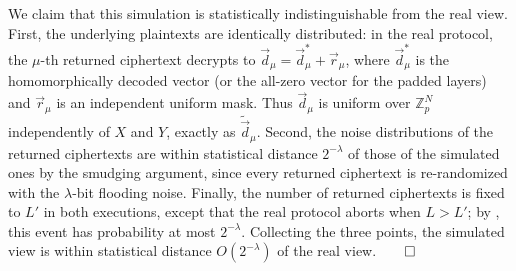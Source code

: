 We claim that this simulation is statistically indistinguishable from the real view. First, the underlying plaintexts are identically distributed: in the real protocol, the $\mu$-th returned ciphertext decrypts to $\vec d_\mu=\vec d_\mu^*+\vec r_\mu$, where $\vec d_\mu^*$ is the homomorphically decoded vector (or the all-zero vector for the padded layers) and $\vec r_\mu$ is an independent uniform mask. Thus $\vec d_\mu$ is uniform over $\mathbb Z_p^N$ independently of $X$ and $Y$, exactly as $\tilde{\vec d}_\mu$. Second, the noise distributions of the returned ciphertexts are within statistical distance $2^{-\lambda}$ of those of the simulated ones by the smudging argument, since every returned ciphertext is re-randomized with the $\lambda$-bit flooding noise. Finally, the number of returned ciphertexts is fixed to $L'$ in both executions, except that the real protocol aborts when $L>L'$; by , this event has probability at most $2^{-\lambda}$. Collecting the three points, the simulated view is within statistical distance $O(2^{-\lambda})$ of the real view.$\qed$








